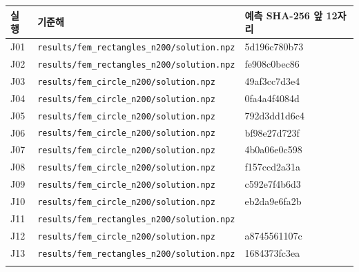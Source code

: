 \documentclass[10pt,a4paper]{article}
\begin{document}
\par\begin{minipage}{\linewidth}\begin{tabular}{>{\raggedright\arraybackslash}p{}>{\raggedright\arraybackslash}p{}>{\raggedright\arraybackslash}p{}}

\rowcolor{tint} \textbf{실행} & \textbf{기준해} & \textbf{예측 SHA-256 앞 12자리}\\\midrule

J01 & \nolinkurl{results/fem_rectangles_n200/solution.npz} & 5d196c780b73\\\addlinespace[2pt]

J02 & \nolinkurl{results/fem_rectangles_n200/solution.npz} & fe908c0bec86\\\addlinespace[2pt]

J03 & \nolinkurl{results/fem_circle_n200/solution.npz} & 49af3cc7d3e4\\\addlinespace[2pt]

J04 & \nolinkurl{results/fem_circle_n200/solution.npz} & 0fa4a4f4084d\\\addlinespace[2pt]

J05 & \nolinkurl{results/fem_circle_n200/solution.npz} & 792d3dd1d6c4\\\addlinespace[2pt]

J06 & \nolinkurl{results/fem_circle_n200/solution.npz} & bf98e27d723f\\\addlinespace[2pt]

J07 & \nolinkurl{results/fem_circle_n200/solution.npz} & 4b0a06e0c598\\\addlinespace[2pt]

J08 & \nolinkurl{results/fem_circle_n200/solution.npz} & f157ccd2a31a\\\addlinespace[2pt]

J09 & \nolinkurl{results/fem_circle_n200/solution.npz} & c592e7f4b6d3\\\addlinespace[2pt]

J10 & \nolinkurl{results/fem_circle_n200/solution.npz} & eb2da9e6fa2b\\\addlinespace[2pt]

J11 & \nolinkurl{results/fem_rectangles_n200/solution.npz} & 704638945474\\\addlinespace[2pt]

J12 & \nolinkurl{results/fem_circle_n200/solution.npz} & a8745561107c\\\addlinespace[2pt]

J13 & \nolinkurl{results/fem_rectangles_n200/solution.npz} & 1684373fc3ea\\\addlinespace[2pt]

\bottomrule\end{tabular}\end{minipage}\par\vspace{5pt}\endgroup
\end{document}
